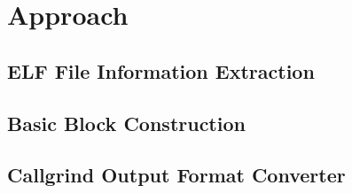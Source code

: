 \section{Approach}
\subsection{ELF File Information Extraction}
\subsection{Basic Block Construction}
\subsection{Callgrind Output Format Converter}